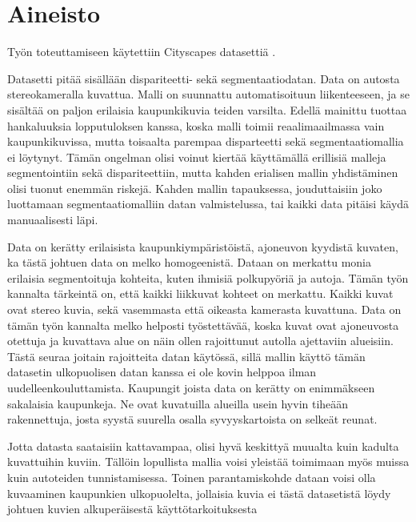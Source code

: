 \chapter{Aineisto}%
\label{ch:aineisto}

Työn toteuttamiseen käytettiin Cityscapes datasettiä \cite{Cordts2016Cityscapes}.


Datasetti pitää sisällään dispariteetti- sekä segmentaatiodatan.
Data on autosta stereokameralla kuvattua.
Malli on suunnattu automatisoituun liikenteeseen, ja se sisältää on paljon erilaisia kaupunkikuvia teiden varsilta.
Edellä mainittu tuottaa hankaluuksia lopputuloksen kanssa, koska malli toimii reaalimaailmassa vain kaupunkikuvissa,
mutta toisaalta parempaa disparteetti sekä segmentaatiomallia ei löytynyt. 
Tämän ongelman olisi voinut kiertää käyttämällä erillisiä malleja segmentointiin sekä dispariteettiin,
mutta kahden erialisen mallin yhdistäminen olisi tuonut enemmän riskejä.
Kahden mallin tapauksessa, jouduttaisiin joko luottamaan segmentaatiomalliin datan valmistelussa, 
tai kaikki data pitäisi käydä manuaalisesti läpi.

Data on kerätty erilaisista kaupunkiympäristöistä, ajoneuvon kyydistä kuvaten, ka tästä johtuen data on melko homogeenistä.
Dataan on merkattu monia erilaisia segmentoituja kohteita, kuten ihmisiä polkupyöriä ja autoja. 
Tämän työn kannalta tärkeintä on, että kaikki liikkuvat kohteet on merkattu.
Kaikki kuvat ovat stereo kuvia, sekä vasemmasta että oikeasta kamerasta kuvattuna.
Data on tämän työn kannalta melko helposti työstettävää, koska kuvat ovat ajoneuvosta otettuja ja kuvattava alue on näin ollen rajoittunut autolla ajettaviin alueisiin.
Tästä seuraa joitain rajoitteita datan käytössä, sillä mallin käyttö tämän datasetin ulkopuolisen datan kanssa ei ole kovin helppoa ilman uudelleenkouluttamista.
Kaupungit joista data on kerätty on enimmäkseen sakalaisia kaupunkeja.
Ne ovat kuvatuilla alueilla usein hyvin tiheään rakennettuja, josta syystä suurella osalla syvyyskartoista on selkeät reunat.

Jotta datasta saataisiin kattavampaa, olisi hyvä keskittyä muualta kuin kadulta kuvattuihin kuviin.
Tällöin lopullista mallia voisi yleistää toimimaan myös muissa kuin autoteiden tunnistamisessa.
Toinen parantamiskohde dataan voisi olla kuvaaminen kaupunkien ulkopuolelta,
jollaisia kuvia ei tästä datasetistä löydy johtuen kuvien alkuperäisestä käyttötarkoituksesta

